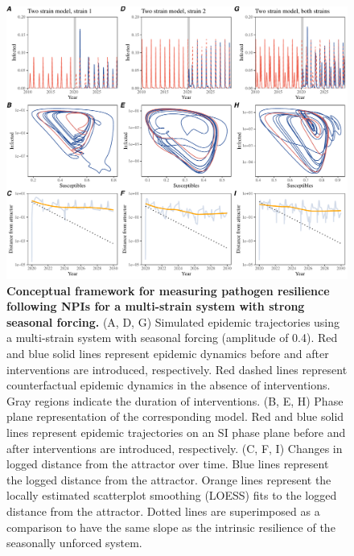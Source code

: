\documentclass[12pt]{article}
\begin{document}
\begin{figure}[!th]
\includegraphics[width=\textwidth]{../figure2/figure2_multi_strong.pdf}
\caption{
\textbf{Conceptual framework for measuring pathogen resilience following NPIs for a multi-strain system with strong seasonal forcing.}
(A, D, G) Simulated epidemic trajectories using a multi-strain system with seasonal forcing (amplitude of 0.4).
Red and blue solid lines represent epidemic dynamics before and after interventions are introduced, respectively.
Red dashed lines represent counterfactual epidemic dynamics in the absence of interventions.
Gray regions indicate the duration of interventions.
(B, E, H) Phase plane representation of the corresponding model.
Red and blue solid lines represent epidemic trajectories on an SI phase plane before and after interventions are introduced, respectively.
(C, F, I) Changes in logged distance from the attractor over time.
Blue lines represent the logged distance from the attractor.
Orange lines represent the locally estimated scatterplot smoothing (LOESS) fits to the logged distance from the attractor.
Dotted lines are superimposed as a comparison to have the same slope as the intrinsic resilience of the seasonally unforced system.
}
\end{figure}

\pagebreak
\end{document}
